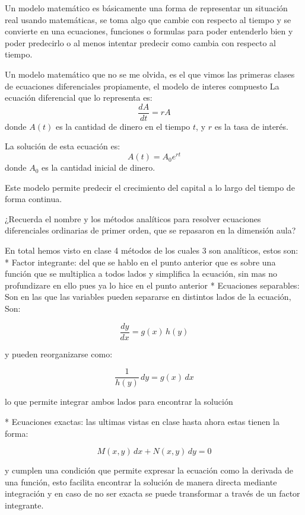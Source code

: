 \begin{respuesta}

 
Un modelo matemático es básicamente una forma de representar un situación real usando matemáticas, se toma algo que cambie con respecto al tiempo y se convierte en una ecuaciones, funciones o formulas para poder entenderlo bien y poder predecirlo o al menos intentar predecir como cambia con respecto al tiempo.

Un modelo matemático que no se me olvida, es el que vimos las primeras clases de ecuaciones diferenciales propiamente, el modelo de interes compuesto
La ecuación diferencial que lo representa es:
\[
\frac{dA}{dt} = rA
\]
donde $A(t)$ es la cantidad de dinero en el tiempo $t$, y $r$ es la tasa de interés.

La solución de esta ecuación es:
\[
A(t) = A_0 e^{rt}
\]
donde $A_0$ es la cantidad inicial de dinero.

Este modelo permite predecir el crecimiento del capital a lo largo del tiempo de forma continua.

    \vspace{5cm}
\end{respuesta}

 ¿Recuerda el nombre y los métodos analíticos para resolver ecuaciones
diferenciales ordinarias de primer orden, que se repasaron en la dimensión aula?

\begin{respuesta}

En total hemos visto en clase 4 métodos de los cuales 3 son analíticos, estos son:
\vspace{0.2cm}
* Factor integrante: del que se hablo en el punto anterior que es sobre una función que se multiplica a todos lados y simplifica la ecuación, sin mas no profundizare en ello pues ya lo hice en el punto anterior
\vspace{0.1cm}
* Ecuaciones separables: Son en las que las variables pueden separarse en distintos lados de la ecuación, Son: 

\[
\frac{dy}{dx} = g(x)\,h(y)
\]

y pueden reorganizarse como:

\[
\frac{1}{h(y)}\,dy = g(x)\,dx
\]

lo que permite integrar ambos lados para encontrar la solución

* Ecuaciones exactas: las ultimas vistas en clase hasta ahora estas tienen la forma:

\[
M(x,y)\,dx + N(x,y)\,dy = 0
\]

y cumplen una condición que permite expresar la ecuación como la derivada de una función, esto facilita encontrar la solución de manera directa mediante integración y en caso de no ser exacta se puede transformar a través de un factor integrante.

    \vspace{5cm}
\end{respuesta}

